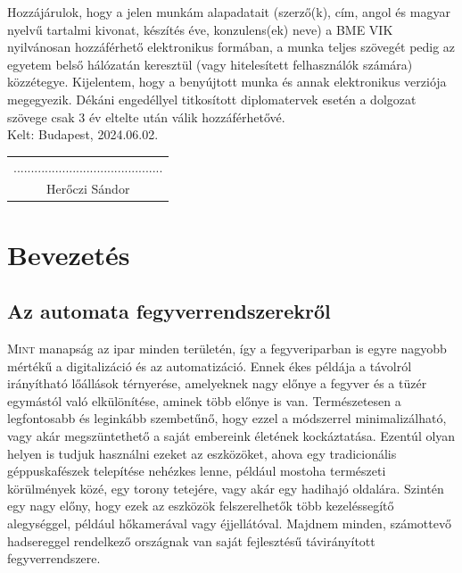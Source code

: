 \documentclass[12pt,a4paper]{article}
\newcommand{\LOCATION}{Budapest}
\begin{document}
Hozzájárulok, hogy a jelen munkám alapadatait (szerző(k), cím, angol és magyar nyelvű tartalmi kivonat, készítés éve, konzulens(ek) neve) a BME VIK nyilvánosan hozzáférhető elektronikus formában, a munka teljes szövegét pedig az egyetem belső hálózatán keresztül (vagy hitelesített felhasználók számára) közzétegye. Kijelentem, hogy a benyújtott munka és annak elektronikus verziója megegyezik. Dékáni engedéllyel titkosított diplomatervek esetén a dolgozat szövege csak 3 év eltelte után válik hozzáférhetővé.\\

Kelt: \LOCATION, 2024.06.02.\\

\hfill
\begin{tabular}{c}
	........................................... \\
	Herőczi Sándor \\
\end{tabular}

\pagebreak


\section{Bevezetés}

\subsection{Az automata fegyverrendszerekről}

\lettrine{M}{int} manapság az ipar minden területén, így a fegyveriparban is egyre nagyobb mértékű a digitalizáció és az automatizáció. Ennek ékes példája a távolról irányítható lőállások térnyerése, amelyeknek nagy előnye a fegyver és a tüzér egymástól való elkülönítése, aminek több előnye is van. Természetesen a legfontosabb és leginkább szembetűnő, hogy ezzel a módszerrel minimalizálható, vagy akár megszüntethető a saját embereink életének kockáztatása. Ezentúl olyan helyen is tudjuk használni ezeket az eszközöket, ahova egy tradicionális géppuskafészek telepítése nehézkes lenne, például mostoha természeti körülmények közé, egy torony tetejére, vagy akár egy hadihajó oldalára. Szintén egy nagy előny, hogy ezek az eszközök felszerelhetők több kezeléssegítő alegységgel, például hőkamerával vagy éjjellátóval. Majdnem minden, számottevő hadsereggel rendelkező országnak van saját fejlesztésű távirányított fegyverrendszere.\\
\end{document}
